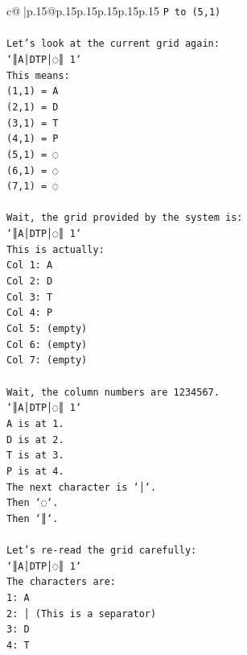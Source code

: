 \documentclass{article}
\begin{document}
{\begin{supertabular}{c@{$\;$}|p{.15\linewidth}@{}p{.15\linewidth}p{.15\linewidth}p{.15\linewidth}p{.15\linewidth}p{.15\linewidth}}
{{{\texttt{P to (5,1)} \\
\\ 
\texttt{Let's look at the current grid again:} \\
\texttt{`║A│DTP│◌║ 1`} \\
\texttt{This means:} \\
\texttt{(1,1) = A} \\
\texttt{(2,1) = D} \\
\texttt{(3,1) = T} \\
\texttt{(4,1) = P} \\
\texttt{(5,1) = ◌} \\
\texttt{(6,1) = ◌} \\
\texttt{(7,1) = ◌} \\
\\ 
\texttt{Wait, the grid provided by the system is:} \\
\texttt{`║A│DTP│◌║ 1`} \\
\texttt{This is actually:} \\
\texttt{Col 1: A} \\
\texttt{Col 2: D} \\
\texttt{Col 3: T} \\
\texttt{Col 4: P} \\
\texttt{Col 5: (empty)} \\
\texttt{Col 6: (empty)} \\
\texttt{Col 7: (empty)} \\
\\ 
\texttt{Wait, the column numbers are 1234567.} \\
\texttt{`║A│DTP│◌║ 1`} \\
\texttt{A is at 1.} \\
\texttt{D is at 2.} \\
\texttt{T is at 3.} \\
\texttt{P is at 4.} \\
\texttt{The next character is `│`.} \\
\texttt{Then `◌`.} \\
\texttt{Then `║`.} \\
\\ 
\texttt{Let's re{-}read the grid carefully:} \\
\texttt{`║A│DTP│◌║ 1`} \\
\texttt{The characters are:} \\
\texttt{1: A} \\
\texttt{2: │ (This is a separator)} \\
\texttt{3: D} \\
\texttt{4: T} \\
}}}
\end{supertabular}}
\end{document}
